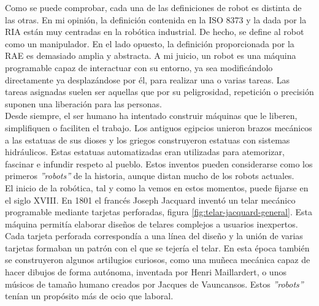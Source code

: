 Como se puede comprobar, cada una de las definiciones de robot es distinta de las otras. En mi opinión, la definición contenida en la ISO 8373 y la dada por la RIA están muy centradas en la robótica industrial. De hecho, se define al robot como un manipulador. En el lado opuesto, la definición proporcionada por la RAE es demasiado amplia y abstracta. A mi juicio, un robot es una máquina programable capaz de interactuar con su entorno, ya sea modificándolo directamente ya desplazándose por él, para realizar una o varias tareas. Las tareas asignadas suelen ser aquellas que por su peligrosidad, repetición o precisión suponen una liberación para las personas.\\

Desde siempre, el ser humano ha intentado construir máquinas que le liberen, simplifiquen o faciliten el trabajo. Los antiguos egipcios unieron brazos mecánicos a las estatuas de sus dioses y los griegos construyeron estatuas con sistemas hidráulicos. Estas estatuas automatizadas eran utilizadas para atemorizar, fascinar e infundir respeto al pueblo. Estos inventos pueden considerarse como los primeros \textit{''robots''} de la historia, aunque distan mucho de los robots actuales.\\

El inicio de la robótica, tal y como la vemos en estos momentos, puede fijarse en el siglo XVIII. En 1801 el francés Joseph Jacquard inventó un telar mecánico programable mediante tarjetas perforadas, figura \ref{fig:telar-jacquard-general}. Esta máquina permitía elaborar diseños de telares complejos a usuarios inexpertos. Cada tarjeta perforada correspondía a una línea del diseño y la unión de varias tarjetas formaban un patrón con el que se tejería el telar. En esta época también se construyeron algunos artilugios curiosos, como una muñeca mecánica capaz de hacer dibujos de forma autónoma, inventada por Henri Maillardert, o unos músicos de tamaño humano creados por Jacques de Vauncansos. Estos \textit{''robots''} tenían un propósito más de ocio que laboral.\\

